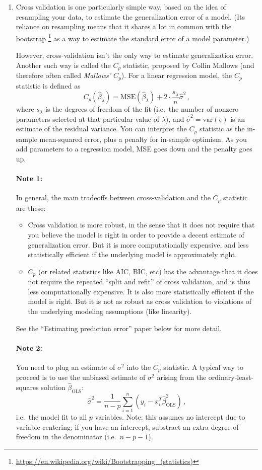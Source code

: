 \documentclass[11 pt]{article}
\begin{document}
\begin{enumerate}[label=(\Alph*)]
\newpage
\item Cross validation is one particularly simple way, based on the idea of resampling your data, to estimate the generalization error of a model.  (Its reliance on resampling means that it shares a lot in common with the bootstrap \footnote{\url{https://en.wikipedia.org/wiki/Bootstrapping_(statistics)}} as a way to estimate the standard error of a model parameter.)

However, cross-validation isn't the only way to estimate generalization error.  Another such way is called the $C_p$ statistic, proposed by Collin Mallows (and therefore often called \textit{Mallows' $C_p$}).  For a linear regression model, the $C_p$ statistic is defined as
$$
C_p(\hat{\beta}_\lambda) = \mathrm{MSE}(\hat \beta_{\lambda}) + 2 \cdot \frac{s_{\lambda}}{n} \hat \sigma^2 \, ,
$$
where $s_{\lambda}$ is the degrees of freedom of the fit (i.e.~the number of nonzero parameters selected at that particular value of $\lambda$), and $\hat \sigma^2 = \mathrm{var}(\epsilon)$ is an estimate of the residual variance.  You can interpret the $C_p$ statistic as the in-sample mean-squared error, plus a penalty for in-sample optimism.  As you add parameters to a regression model, MSE goes down and the penalty goes up. 


\paragraph{Note 1:} In general, the main tradeoffs between cross-validation and the $C_p$ statistic are these:
\begin{itemize}
	\item  Cross validation is more robust, in the sense that it does not require that you believe the model is right in order to provide a decent estimate of generalization error.  But it is more computationally expensive, and less statistically efficient if the underlying model is approximately right.
	\item $C_p$ (or related statistics like AIC, BIC, etc) has the advantage that it does not require the repeated ``split and refit'' of cross validation, and is thus less computationally expensive.  It is also more statistically efficient if the model is right.  But it is not as robust as cross validation to violations of the underlying modeling assumptions (like linearity).
\end{itemize}
See the ``Estimating prediction error'' paper below for more detail.

\paragraph{Note 2:} You need to plug an estimate of $\sigma^2$ into the $C_p$ statistic.  A typical way to proceed is to use the unbiased estimate of $\sigma^2$ arising from the ordinary-least-squares solution $\hat \beta_{\mathrm{OLS}}$:
$$
\hat{\sigma}^2 = \frac{1}{n - p} \sum_{i=1}^n (y_i - x_i^T \hat \beta_{\mathrm{OLS}}^2) \, ,
$$
i.e.~the model fit to all $p$ variables.  Note: this assumes no intercept due to variable centering; if you have an intercept, substract an extra degree of freedom in the denominator (i.e.~$n-p-1$).


\end{enumerate}
\end{document}
